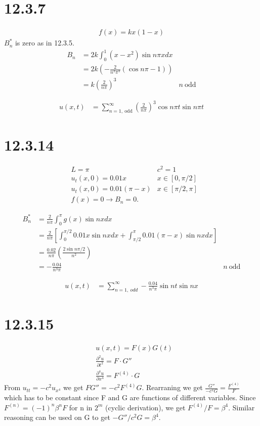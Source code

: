 \documentclass[11pt,a4paper]{article}
\begin{document}
\section*{12.3.7}
\begin{align*}
    f(x) = kx(1-x)
\end{align*}
$B_n^*$ is zero as in 12.3.5.
\begin{align*}
    B_n &= 2k \int_0^1 (x-x^2) \sin n\pi x dx \\
    &= 2k \left(-\frac{2}{n^3\pi^3}(\cos n\pi - 1) \right) \\
    &= k \left(\frac{2}{n\pi}\right)^3 & n\ \text{odd}
\end{align*}

\begin{align*}
    u(x, t) &= \sum_{n=1,\ \text{odd}}^\infty 
        \left( \frac{2}{n\pi} \right)^3
        \cos n\pi t
        \sin n\pi t
\end{align*}

\newpage

\section*{12.3.14}
\begin{align*}
    & L = \pi & c^2 = 1 \\
    & u_t(x, 0) = 0.01x & x \in [0, \pi/2] \\
    & u_t(x, 0) = 0.01(\pi - x) & x \in [\pi/2, \pi] \\
    & f(x) = 0 \rightarrow B_n = 0.
\end{align*}

\begin{align*}
    B_n^* &= \frac{2}{n\pi} \int_0^\pi g(x)\sin nx dx \\
    &= \frac{2}{n\pi} \left[
        \int_0^{\pi/2} 0.01x\sin nx dx
        + \int_{\pi/2}^\pi 0.01(\pi-x)\sin nx dx
    \right] \\ 
    &= \frac{0.02}{n\pi}\left(\frac{2\sin n\pi/2}{n^2}\right) \\
    &= -\frac{0.04}{n^3\pi} & n\ \text{odd}
\end{align*}

\begin{align*}
    u(x, t) &= \sum_{n=1,\ odd}^\infty 
        - \frac{0.04}{n^3\pi} \sin nt \sin nx
\end{align*}

\section*{12.3.15}
\begin{align*}
    &u(x, t) = F(x)G(t) \\
    &\frac{\partial^2 u}{\partial t^2} = F \cdot G'' \\
    &\frac{\partial^4 u}{\partial x^4} = F^{(4)} \cdot G
\end{align*}
From $u_{tt}=-c^2u_{x^4}$ we get $FG'' = -c^2 F^{(4)}G$. Rearraning we get
$\frac{G''}{-c^2G} = \frac{F^{(4)}}{F}$ which has to be constant since F and G are 
functions of different variables. Since $F^{(n)} = (-1)^n\beta^n F$ for n in 
$2^m$ (cyclic derivation), we get $F^{(4)}/F = \beta^4$. Similar reasoning can be used
on G to get $-G''/c^2G = \beta^4$.
\end{document}
